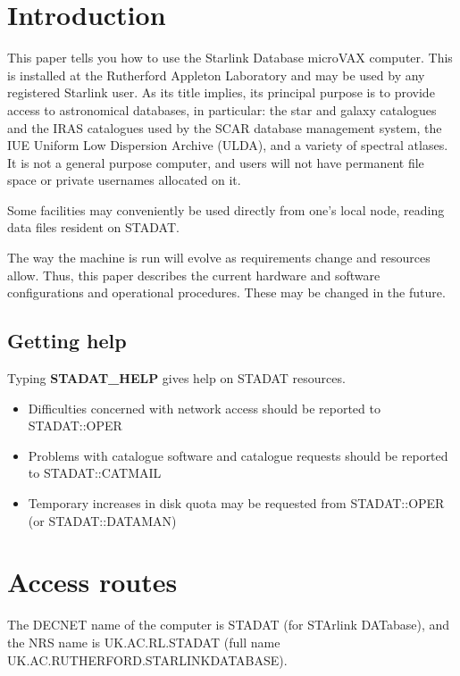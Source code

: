 \documentclass[nolof,11pt,noabs]{starlink}
\begin{document}
\scfrontmatter

\newpage
\section{Introduction}

This paper tells you how to use the Starlink Database microVAX computer.
This is installed at the Rutherford Appleton Laboratory and may be used by any
registered Starlink user.
As its title implies, its
principal purpose is to provide access to astronomical
databases, in particular: the star and galaxy catalogues and the IRAS catalogues
used by the SCAR database management system, the IUE Uniform Low Dispersion
Archive (ULDA), and a variety of spectral atlases.
It is not a general purpose computer, and users will not have permanent
file space or private usernames allocated on it.

Some facilities may conveniently be used directly from one's local node,
reading data files resident on STADAT.

The way the machine is run will evolve as requirements change and resources
allow.
Thus, this paper describes the current
hardware and software configurations
and operational procedures.
These may be changed in the future.


\subsection{Getting help}

Typing \textbf{STADAT\_HELP} gives help on STADAT resources.
\begin{itemize}
\item Difficulties concerned with network
     access should be reported to STADAT::OPER
\item Problems with catalogue software and catalogue requests should be reported
      to STADAT::CATMAIL
\item Temporary increases in disk quota may be requested from STADAT::OPER
      (or STADAT::DATAMAN)
\end{itemize}

\section{Access routes}

The DECNET name of the computer is STADAT (for STArlink DATabase), and
the NRS name is UK.AC.RL.STADAT (full name
UK.AC.RUTHERFORD.STARLINKDATABASE).
\end{document}

